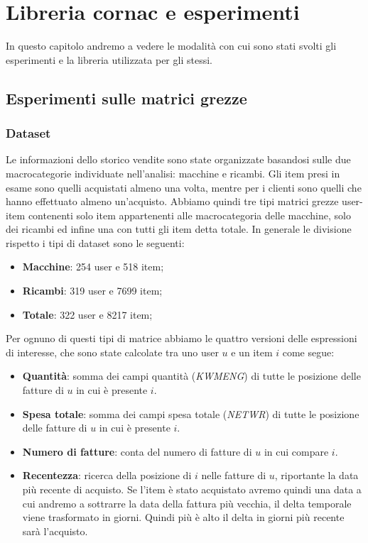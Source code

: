 \hypertarget{(chap:capitolo6)}{}
\chapter{Libreria cornac e esperimenti}
In questo capitolo andremo a vedere le modalità con cui sono stati svolti gli esperimenti e la libreria utilizzata per gli stessi.
\section{Esperimenti sulle matrici grezze}
\subsection{Dataset}
Le informazioni dello storico vendite sono state organizzate basandosi sulle due macrocategorie individuate nell'analisi: macchine e ricambi.
Gli item presi in esame sono quelli acquistati almeno una volta, mentre per i clienti sono quelli che hanno effettuato almeno un'acquisto.
Abbiamo quindi tre tipi matrici grezze user-item contenenti solo item appartenenti alle macrocategoria delle macchine, solo dei ricambi ed infine una con tutti gli item detta totale.
In generale le divisione rispetto i tipi di dataset sono le seguenti:
\begin{itemize}
    \item \textbf{Macchine}: 254 user e 518 item;
    \item \textbf{Ricambi}: 319 user e 7699 item;
    \item \textbf{Totale}: 322 user e 8217 item;
\end{itemize}

Per ognuno di questi tipi di matrice abbiamo le quattro versioni delle espressioni di interesse, che sono state calcolate tra uno user $u$ e un item $i$ come segue:
\begin{itemize}
    \item \textbf{Quantità}: somma dei campi quantità (\textit{KWMENG}) di tutte le posizione delle fatture di $u$ in cui è presente $i$.
    \item \textbf{Spesa totale}: somma dei campi spesa totale (\textit{NETWR}) di tutte le posizione delle fatture di $u$ in cui è presente $i$.
    \item \textbf{Numero di fatture}: conta del numero di fatture di $u$ in cui compare $i$.
    \item \textbf{Recentezza}: ricerca della posizione di $i$ nelle fatture di $u$, riportante la data più recente di acquisto. Se l'item è stato acquistato avremo quindi una data a cui andremo a sottrarre la data della fattura più vecchia, il delta temporale viene trasformato in giorni. Quindi più è alto il delta in giorni più recente sarà l'acquisto.
\end{itemize}

